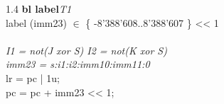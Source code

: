 


\begin{instructionblock}{1.4\imagewidth}%
    \textbf{bl label}\hfill\textit{T1}\\
    label (imm23) $\in$ \{ -8'388'608..8'388'607 \} {<}{<} 1\\
    {}\\
    \textit{I1 = not(J xor S) I2 = not(K xor S)}\\
    \textit{imm23 = s:i1:i2:imm10:imm11:0}\\
    lr = pc | 1u;\\
    pc = pc + imm23 {<}{<} 1;
\end{instructionblock}

